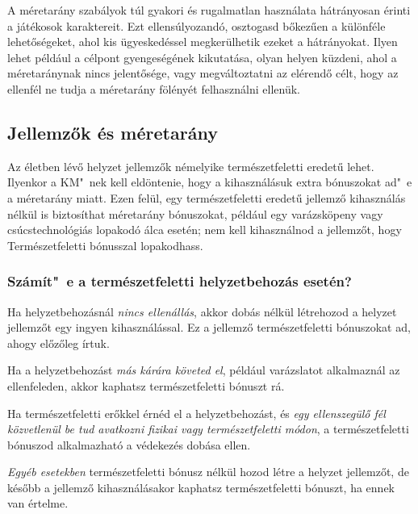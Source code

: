 A méretarány szabályok túl gyakori és rugalmatlan használata hátrányosan érinti a játékosok karaktereit. Ezt ellensúlyozandó, osztogasd bőkezűen a különféle lehetőségeket, ahol kis ügyeskedéssel megkerülhetik ezeket a hátrányokat. Ilyen lehet például a célpont gyengeségének kikutatása, olyan helyen küzdeni, ahol a méretaránynak nincs jelentősége, vagy megváltoztatni az elérendő célt, hogy az ellenfél ne tudja a méretarány fölényét felhasználni ellenük.

\newpage

\subsection{Jellemzők és méretarány}

Az életben lévő helyzet jellemzők némelyike természetfeletti eredetű lehet. Ilyenkor a KM"~nek kell eldöntenie, hogy a kihasználásuk extra bónuszokat ad"~e a méretarány miatt. Ezen felül, egy természetfeletti eredetű jellemző kihasználás nélkül is biztosíthat méretarány bónuszokat, például egy varázsköpeny vagy csúcstechnológiás lopakodó álca esetén; nem kell kihasználnod a  jellemzőt, hogy Természetfeletti bónusszal lopakodhass.

\subsubsection{Számít"~e a természetfeletti helyzetbehozás esetén?}

Ha helyzetbehozásnál \emph{nincs ellenállás}, akkor dobás nélkül létrehozod a helyzet jellemzőt egy ingyen kihasználással. Ez a jellemző természetfeletti bónuszokat ad, ahogy előzőleg írtuk.

Ha a helyzetbehozást \emph{más kárára követed el}, például  varázslatot alkalmaznál az ellenfeleden, akkor kaphatsz természetfeletti bónuszt rá.

Ha természetfeletti erőkkel érnéd el a helyzetbehozást, és \emph{egy ellenszegülő fél közvetlenül be tud avatkozni fizikai vagy természetfeletti módon}, a természetfeletti bónuszod alkalmazható a védekezés dobása ellen.

\emph{Egyéb esetekben} természetfeletti bónusz nélkül hozod létre a helyzet jellemzőt, de később a jellemző kihasználásakor kaphatsz természetfeletti bónuszt, ha ennek van értelme.
